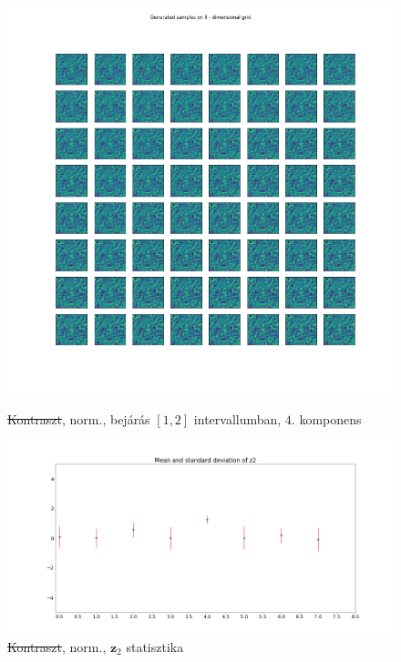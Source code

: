 \documentclass[12pt, english]{article}
\begin{document}
\begin{figure}[H] 
  \label{fig:contrast-correlation} 
  \begin{minipage}{0.4\linewidth}
    \centering
    \includegraphics[width=.8\linewidth]{sweep/norm_no_contrast_sweep_one_to_two_4th_param.png} 
    \caption{\st{Kontraszt}, norm., bejárás $[1, 2]$ intervallumban, $4.$ komponens} 
    \label{fig:no-contrast-norm-sweep}
  \end{minipage}%
  \begin{minipage}{0.6\linewidth}
    \centering
    \includegraphics[width=1\linewidth]{sweep/norm_no_contrast_z2_stats.png} 
    \caption{\st{Kontraszt}, norm.,  $\bm{z}_{2}$ statisztika} 
    \label{fig:no-contrast-no-norm-stats}
  \end{minipage} 
\end{figure}

\vspace{4mm} 
 
\end{document}
